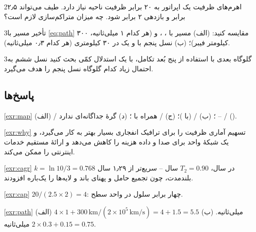 \documentclass[11pt,a4paper]{article}
\begin{document}
\begin{exercisebox}{2}{اهرم‌های ظرفیت}\label{exr:cap}
یک اپراتور به ۲۰ برابر ظرفیت ناحیه نیاز دارد. طیف می‌تواند ۲٫۵ برابر و بازدهی ۲ برابر شود. چه میزان متراکم‌سازی لازم است؟
\end{exercisebox}

\begin{exercisebox}{3}{تأخیر مسیر}\label{exr:path}
با \cref{eq:path} مقایسه کنید: (الف) مسیر  با ، ،  و  (هر کدام ۱ میلی‌ثانیه، ۳۰۰ کیلومتر فیبر)؛ (ب) نسل
پنجم با  و یک  در ۳۰ کیلومتری (هر کدام ۰٫۳ میلی‌ثانیه).
\end{exercisebox}

\begin{exercisebox}{3}{گلوگاه بعدی}\label{exr:next}
با استفاده از پنج بُعد تکامل، با یک استدلال کمّی بحث کنید نسل ششم به احتمال زیاد کدام گلوگاه نسل پنجم را هدف می‌گیرد.
\end{exercisebox}

\subsection*{پاسخ‌ها}

\begin{solutionbox}{\ref{exr:map}}
(الف)  / ؛ (ب)  /  (با )؛ (ج)  /  همراه با ؛ (د) گرهٔ جداگانه‌ای ندارد --
 /  ().
\end{solutionbox}

\begin{solutionbox}{\ref{exr:why}}
تسهیم آماری ظرفیت را برای ترافیک انفجاری بسیار بهتر به کار می‌گیرد، و یک شبکهٔ  واحد برای صدا و داده هزینه را کاهش می‌دهد و ارائهٔ مستقیم
خدمات اینترنتی را ممکن می‌کند.
\end{solutionbox}

\begin{solutionbox}{\ref{exr:cagr}}
$k = \ln 10/3 = 0.768$ در سال، $T_2 = 0.90$ سال -- سریع‌تر از ۱٫۲۹ سال بلندمدت، چون تجمیع حامل و  پهنای باند و لایه‌ها را یک‌باره افزودند.
\end{solutionbox}

\begin{solutionbox}{\ref{exr:cap}}
$20/(2.5\times2) = 4$: چهار برابر سلول در واحد سطح.
\end{solutionbox}

\begin{solutionbox}{\ref{exr:path}}
(الف) $4\times1 + 300\,\text{km}/(2\times10^{5}\,\text{km/s}) = 4 + 1.5 = 5.5$ میلی‌ثانیه. (ب) $2\times0.3 + 0.15 = 0.75$ میلی‌ثانیه.
\end{solutionbox}
\end{document}
